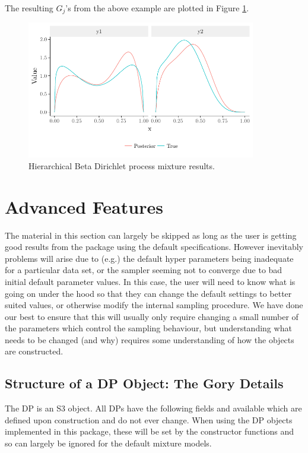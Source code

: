 \documentclass[nojss]{jss}
\begin{document}
The resulting $G_j$'s from the above example are plotted in Figure \ref{fig:hierBeta}.
\begin{figure}
\centering
\includegraphics[height=60mm, width=100mm]{img/hierBetaGraph.pdf}
\caption{Hierarchical Beta Dirichlet process mixture results.}
\label{fig:hierBeta}
\end{figure}

\section{Advanced Features}
The material in this section can largely be skipped as long as the user is getting good results from the  package using the default specifications. However inevitably problems will arise due to (e.g.) the default hyper parameters being inadequate for a particular data set, or the sampler seeming not to converge due to bad initial default parameter values. In this case, the user will need to know  what is going on under the hood so that they can change the default settings to better suited values, or otherwise modify the internal sampling procedure. We have done our best to ensure that this will usually only require changing a small number of the parameters which control the sampling behaviour, but understanding what needs to be changed (and why) requires some understanding of how the objects are constructed.

\subsection{Structure of a DP Object: The Gory Details}
The DP is an S3 object. All DPs have the following fields and available which are defined upon construction and do not ever change. When using the DP objects implemented in this package, these will be set by the constructor functions and so can largely be ignored for the default mixture models.
\end{document}
